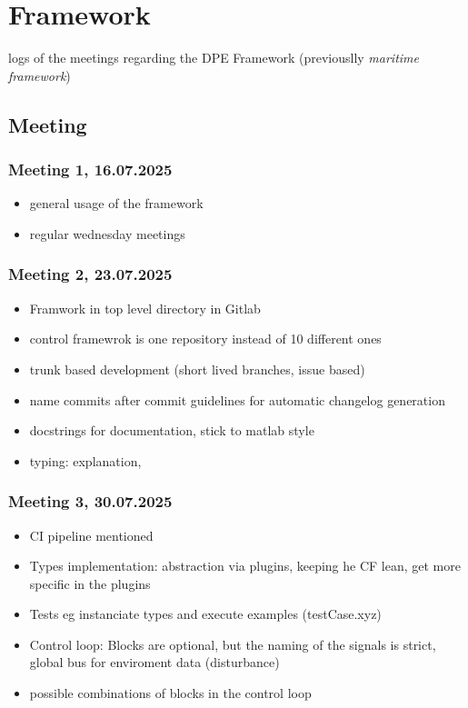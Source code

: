 \documentclass{ltxdockit}
\begin{document}
\tableofcontents

\section{Framework}
\label{sec:framework}

logs of the meetings regarding the DPE Framework (previouslly \textit{maritime framework})

\subsection{Meeting}
\label{sec:framework:meeting}
\subsubsection{Meeting 1, 16.07.2025}
\begin{itemize}
  \item general usage of the framework
  \item regular wednesday meetings
\end{itemize}

\subsubsection{Meeting 2, 23.07.2025}
\begin{itemize}
  \item Framwork in top level directory in Gitlab
  \item control framewrok is one repository instead of 10 different ones
  \item trunk based development (short lived branches, issue based)
  \item name commits after commit guidelines for automatic changelog generation
  \item docstrings for documentation, stick to matlab style
  \item typing: explanation, 
\end{itemize}

\subsubsection{Meeting 3, 30.07.2025}
\begin{itemize}
  \item CI pipeline mentioned
  \item Types implementation: abstraction via plugins, keeping he CF lean, get more specific in the plugins
  \item Tests eg instanciate types and execute examples (testCase.xyz) 
  \item Control loop: Blocks are optional, but the naming of the signals is strict, global bus for enviroment data (disturbance)
  \item possible combinations of blocks in the control loop
\end{itemize}
\end{document}
